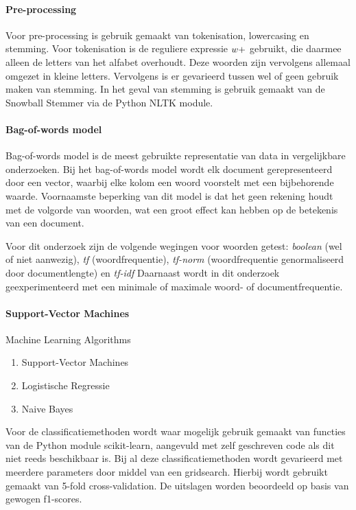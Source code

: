 \paragraph{Pre-processing}
Voor pre-processing is gebruik gemaakt van tokenisation, lowercasing en stemming. Voor tokenisation is de reguliere expressie $\\w+$ gebruikt, die daarmee alleen de letters van het alfabet overhoudt. Deze woorden zijn vervolgens allemaal omgezet in kleine letters. Vervolgens is er gevarieerd tussen wel of geen gebruik maken van stemming. In het geval van stemming is gebruik gemaakt van de Snowball Stemmer via de Python NLTK module.

\paragraph{Bag-of-words model}
Bag-of-words model is de meest gebruikte representatie van data in vergelijkbare onderzoeken. Bij het bag-of-words model wordt elk document gerepresenteerd door een vector, waarbij elke kolom een woord voorstelt met een bijbehorende waarde. Voornaamste beperking van dit model is dat het geen rekening houdt met de volgorde van woorden, wat een groot effect kan hebben op de betekenis van een document.\par
Voor dit onderzoek zijn de volgende wegingen voor woorden getest: \textit{boolean} (wel of niet aanwezig), \textit{tf} (woordfrequentie), \textit{tf-norm} (woordfrequentie genormaliseerd door documentlengte) en \textit{tf-idf} \cite{Hirst_textto}
Daarnaast wordt in dit onderzoek geexperimenteerd met een minimale of maximale woord- of documentfrequentie.

\paragraph{Support-Vector Machines}
Machine Learning Algorithms
\begin{enumerate}
\item Support-Vector Machines
\item Logistische Regressie 
\item Naive Bayes
\end{enumerate}

Voor de classificatiemethoden wordt waar mogelijk gebruik gemaakt van functies van de Python module scikit-learn\cite{scikit-learn}, aangevuld met zelf geschreven code als dit niet reeds beschikbaar is. Bij al deze classificatiemethoden wordt gevarieerd met meerdere parameters door middel van een gridsearch. Hierbij wordt gebruikt gemaakt van 5-fold cross-validation. De uitslagen worden beoordeeld op basis van gewogen f1-scores. 

